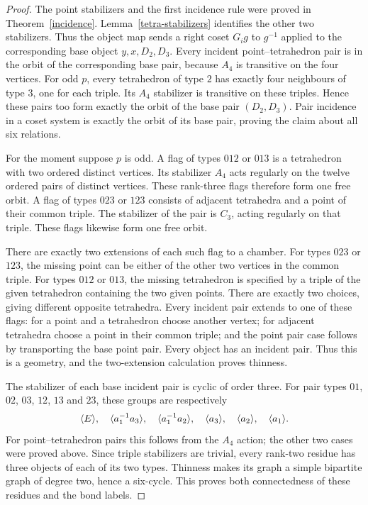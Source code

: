 \begin{proof}
The point stabilizers and the first incidence rule were proved in
Theorem~\ref{incidence}. Lemma~\ref{tetra-stabilizers} identifies
the other two stabilizers. Thus the object map sends a right coset
$G_i g$ to $g^{-1}$ applied to the corresponding base object
$y,x,D_2,D_3$. Every incident point--tetrahedron pair is in the
orbit of the corresponding base pair, because $A_4$ is transitive
on the four vertices. For odd $p$, every tetrahedron of type $2$
has exactly four neighbours of type $3$, one for each triple.
Its $A_4$ stabilizer is transitive on these triples. Hence these
pairs too form exactly the orbit of the base pair $(D_2,D_3)$.
Pair incidence in a coset system is exactly the orbit of its base
pair, proving the claim about all six relations.

For the moment suppose $p$ is odd. A flag of types $012$ or $013$
is a tetrahedron with two ordered distinct vertices. Its stabilizer
$A_4$ acts regularly on the twelve ordered pairs of distinct
vertices. These rank-three flags therefore form one free orbit.
A flag of types $023$ or $123$ consists of adjacent tetrahedra
and a point of their common triple. The stabilizer of the pair is
$C_3$, acting regularly on that triple. These flags likewise form
one free orbit.

There are exactly two extensions of each such flag to a chamber.
For types $023$ or $123$, the missing point can be either of the
other two vertices in the common triple. For types $012$ or
$013$, the missing tetrahedron is specified by a triple of the
given tetrahedron containing the two given points. There are
exactly two choices, giving different opposite tetrahedra.
Every incident pair extends to one of these flags: for a point
and a tetrahedron choose another vertex; for adjacent tetrahedra
choose a point in their common triple; and the point pair case
follows by transporting the base point pair. Every object has
an incident pair. Thus this is a geometry, and the two-extension
calculation proves thinness.

The stabilizer of each base incident pair is cyclic of order
three. For pair types $01$, $02$, $03$, $12$, $13$ and $23$,
these groups are respectively
\[
 \langle E\rangle,\quad\langle a_1^{-1}a_3\rangle,\quad\langle a_1^{-1}a_2\rangle,\quad
 \langle a_3\rangle,\quad\langle a_2\rangle,\quad\langle a_1\rangle.
\]
For point--tetrahedron pairs this follows from the $A_4$ action;
the other two cases were proved above. Since triple stabilizers
are trivial, every rank-two residue has three objects of each
of its two types. Thinness makes its graph a simple bipartite
graph of degree two, hence a six-cycle. This proves both
connectedness of these residues and the bond labels.


\end{proof}
